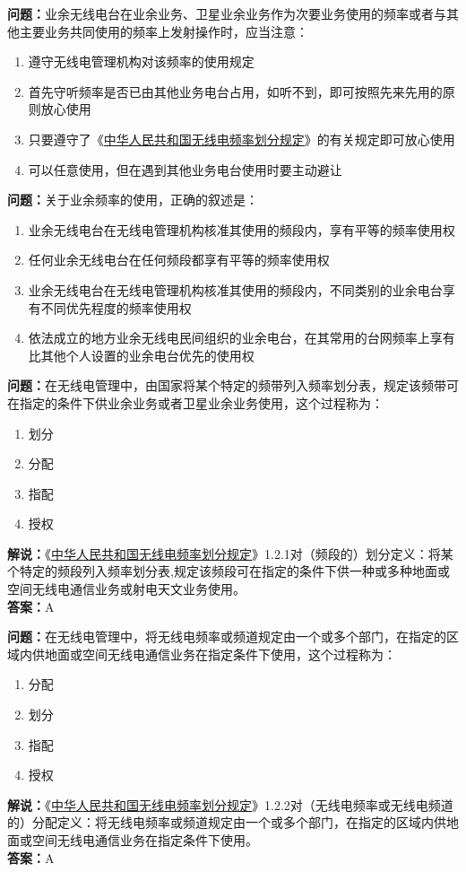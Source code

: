 \textbf{问题：}业余无线电台在业余业务、卫星业余业务作为次要业务使用的频率或者与其他主要业务共同使用的频率上发射操作时，应当注意：
\begin{enumerate}[label=\Alph*), leftmargin=1.5cm]
	\item 遵守无线电管理机构对该频率的使用规定
	\item 首先守听频率是否已由其他业务电台占用，如听不到，即可按照先来先用的原则放心使用
	\item 只要遵守了《\href{https://www.miit.gov.cn/zwgk/zcwj/wjfb/txy/art/2020/art_066386284cd2449493586c81ccafed11.html}{中华人民共和国无线电频率划分规定}》的有关规定即可放心使用
	\item 可以任意使用，但在遇到其他业务电台使用时要主动避让
\end{enumerate}

\textbf{问题：}关于业余频率的使用，正确的叙述是：
\begin{enumerate}[label=\Alph*), leftmargin=1.5cm]
	\item 业余无线电台在无线电管理机构核准其使用的频段内，享有平等的频率使用权
	\item 任何业余无线电台在任何频段都享有平等的频率使用权
	\item 业余无线电台在无线电管理机构核准其使用的频段内，不同类别的业余电台享有不同优先程度的频率使用权
	\item 依法成立的地方业余无线电民间组织的业余电台，在其常用的台网频率上享有比其他个人设置的业余电台优先的使用权
\end{enumerate}

\textbf{问题：}在无线电管理中，由国家将某个特定的频带列入频率划分表，规定该频带可在指定的条件下供业余业务或者卫星业余业务使用，这个过程称为：
\begin{enumerate}[label=\Alph*), leftmargin=1.5cm]
	\item 划分
	\item 分配
	\item 指配
	\item 授权
\end{enumerate}
\textbf{解说：}《\href{https://www.miit.gov.cn/zwgk/zcwj/wjfb/txy/art/2020/art_066386284cd2449493586c81ccafed11.html}{中华人民共和国无线电频率划分规定}》1.2.1对（频段的）划分定义：将某个特定的频段列入频率划分表,规定该频段可在指定的条件下供一种或多种地面或空间无线电通信业务或射电天文业务使用。\\
\textbf{答案：}A

\textbf{问题：}在无线电管理中，将无线电频率或频道规定由一个或多个部门，在指定的区域内供地面或空间无线电通信业务在指定条件下使用，这个过程称为：
\begin{enumerate}[label=\Alph*), leftmargin=1.5cm]
	\item 分配
	\item 划分
	\item 指配
	\item 授权
\end{enumerate}
\textbf{解说：}《\href{https://www.miit.gov.cn/zwgk/zcwj/wjfb/txy/art/2020/art_066386284cd2449493586c81ccafed11.html}{中华人民共和国无线电频率划分规定}》1.2.2对（无线电频率或无线电频道的）分配定义：将无线电频率或频道规定由一个或多个部门，在指定的区域内供地面或空间无线电通信业务在指定条件下使用。\\
\textbf{答案：}A

